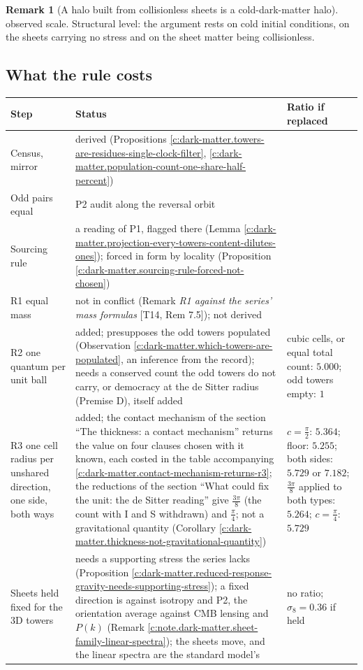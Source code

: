 \documentclass[11pt]{article}
\theoremstyle{definition}
\newtheorem{remark}[theorem]{Remark}
\theoremstyle{plain}
\begin{document}
\begin{remark}[A halo built from collisionless sheets is a cold-dark-matter halo]
observed scale. Structural level: the argument rests on cold initial conditions, on the sheets carrying no stress and on the sheet matter being collisionless.
\end{remark}

\subsection*{What the rule costs}
\label{c:note.dark-matter.setting-what-rule-costs}
\centering \begin{tabular}{>{ \arraybackslash}p{3.4cm}>{ \arraybackslash}p{6.6cm}>{ \arraybackslash}p{3.7cm}}
\toprule
Step & Status & Ratio if replaced \\
\midrule
Census, mirror & derived (Propositions \ref{c:dark-matter.towers-are-residues-single-clock-filter}, \ref{c:dark-matter.population-count-one-share-half-percent}) & \\
Odd pairs equal & P2 audit along the reversal orbit & \\
Sourcing rule & a reading of P1, flagged there (Lemma \ref{c:dark-matter.projection-every-towers-content-dilutes-ones}); forced in form by locality (Proposition \ref{c:dark-matter.sourcing-rule-forced-not-chosen}) & \\
\midrule
R1 equal mass & not in conflict (Remark \emph{R1 against the series' mass formulas} [T14, Rem 7.5]); not derived & \\
R2 one quantum per unit ball & added; presupposes the odd towers populated (Observation \ref{c:dark-matter.which-towers-are-populated}, an inference from the record); needs a conserved count the odd towers do not carry, or democracy at the de Sitter radius (Premise D), itself added & cubic cells, or equal total count: $5.000$; odd towers empty: $1$ \\
R3 one cell radius per unshared direction, one side, both ways & added; the contact mechanism of the section ``The thickness: a contact mechanism'' returns the value on four clauses chosen with it known, each costed in the table accompanying \ref{c:dark-matter.contact-mechanism-returns-r3}; the reductions of the section ``What could fix the unit: the de Sitter reading'' give $\tfrac{3\pi}{8}$ (the count with I and S withdrawn) and $\tfrac{\pi}{4}$; not a gravitational quantity (Corollary \ref{c:dark-matter.thickness-not-gravitational-quantity}) & $c = \tfrac{\pi}{2}$: $5.364$; floor: $5.255$; both sides: $5.729$ or $7.182$; $\tfrac{3\pi}{8}$ applied to both types: $5.264$; $c = \tfrac{\pi}{4}$: $5.729$ \\
Sheets held fixed for the 3D towers & needs a supporting stress the series lacks (Proposition \ref{c:dark-matter.reduced-response-gravity-needs-supporting-stress}); a fixed direction is against isotropy and P2, the orientation average against CMB lensing and $P(k)$ (Remark \ref{c:note.dark-matter.sheet-family-linear-spectra}); the sheets move, and the linear spectra are the standard model's & no ratio; $\sigma_{8} = 0.36$ if held \\
\bottomrule
\end{tabular}
\end{document}
